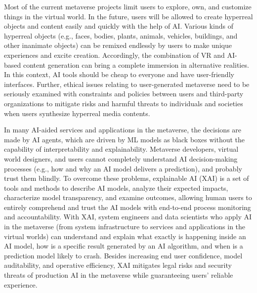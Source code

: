 \documentclass[journal]{IEEEtran}
\begin{document}
Most of the current metaverse projects limit users to explore, own, and customize things in the virtual world. In the future, users will be allowed to create hyperreal objects and content easily and quickly with the help of AI. Various kinds of hyperreal objects (e.g., faces, bodies, plants, animals, vehicles, buildings, and other inanimate objects) can be remixed endlessly by users to make unique experiences and excite creation. Accordingly, the combination of VR and AI-based content generation can bring a complete immersion in alternative realities. In this context, AI tools should be cheap to everyone and have user-friendly interfaces. Further, ethical issues relating to user-generated metaverse need to be seriously examined with constraints and policies between users and third-party organizations to mitigate risks and harmful threats to individuals and societies when users synthesize hyperreal media contents.

In many AI-aided services and applications in the metaverse, the decisions are made by AI agents, which are driven by ML models as black boxes without the capability of interpretability and explainability. Metaverse developers, virtual world designers, and users cannot completely understand AI decision-making processes (e.g., how and why an AI model delivers a prediction), and probably trust them blindly.
To overcome these problems, explainable AI (XAI) is a set of tools and methods to describe AI models, analyze their expected impacts, characterize model transparency, and examine outcomes, allowing human users to entirely comprehend and trust the AI models with end-to-end process monitoring and accountability. 
With XAI, system engineers and data scientists who apply AI in the metaverse (from system infrastructure to services and applications in the virtual worlds) can understand and explain what exactly is happening inside an AI model, how is a specific result generated by an AI algorithm, and when is a prediction model likely to crash.
Besides increasing end user confidence, model auditability, and operative efficiency, XAI mitigates legal risks and security threats of production AI in the metaverse while guaranteeing users' reliable experience.
\end{document}

